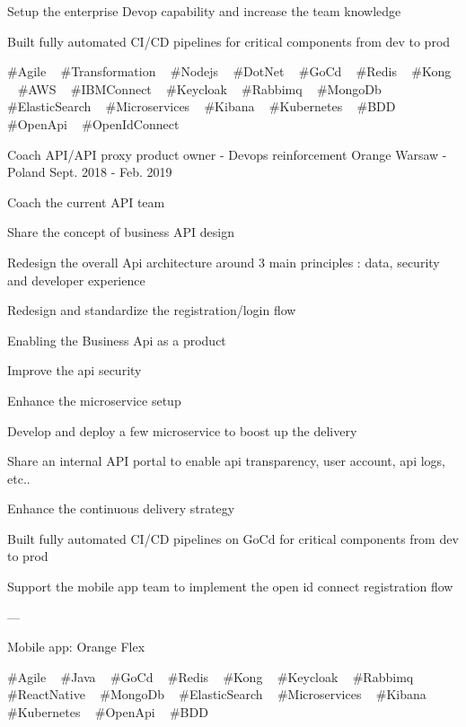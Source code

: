 \begin{cventries}
{\begin{cvitems}
        \item {Setup the enterprise Devop capability and increase the team knowledge}
        \item {Built fully automated CI/CD pipelines for critical components from dev to prod}
      \end{cvitems}
    }
    {
      \#Agile ~
      \#Transformation ~
      \#Nodejs ~
      \#DotNet ~
      \#GoCd ~
      \#Redis ~
      \#Kong ~
      \#AWS ~
      \#IBMConnect ~
      \#Keycloak ~
      \#Rabbimq ~
      \#MongoDb ~
      \#ElasticSearch ~
      \#Microservices ~
      \#Kibana ~
      \#Kubernetes ~
      \#BDD
      \#OpenApi ~
      \#OpenIdConnect ~
    }

  \cventry
    {Coach API/API proxy product owner - Devops reinforcement} %
    {Orange} %
    {Warsaw - Poland} %
    {Sept. 2018 - Feb. 2019} %
    {
      \begin{cvitems} %
        \item {Coach the current API team}
        \item {Share the concept of business API design}
        \item {Redesign the overall Api architecture around 3 main principles : data, security and developer experience}
        \item {Redesign and standardize the registration/login flow}
        \item {Enabling the Business Api as a product}
        \item {Improve the api security}
        \item {Enhance the microservice setup}
        \item {Develop and deploy a few microservice to boost up the delivery}
        \item {Share an internal API portal to enable api transparency, user account, api logs, etc..}
        \item {Enhance the continuous delivery strategy}
        \item {Built fully automated CI/CD pipelines on GoCd for critical components from dev to prod}
        \item {Support the mobile app team to implement the open id connect registration flow}
        \item {---}
        \item {Mobile app: Orange Flex}
      \end{cvitems}
    }
    {
      \#Agile ~
      \#Java ~
      \#GoCd ~
      \#Redis ~
      \#Kong ~
      \#Keycloak ~
      \#Rabbimq ~
      \#ReactNative ~
      \#MongoDb ~
      \#ElasticSearch ~
      \#Microservices ~
      \#Kibana ~
      \#Kubernetes ~
      \#OpenApi ~
      \#BDD
    }


\end{cventries}
